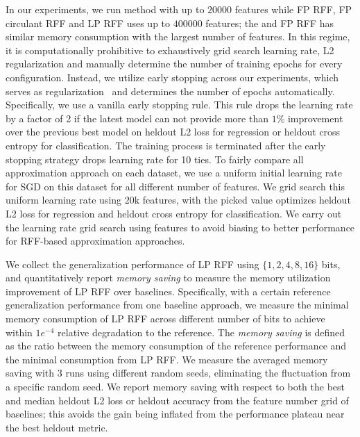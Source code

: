 In our experiments, we run \Nystrom method with up to $20000$ features while FP RFF, FP circulant RFF and LP RFF uses up to $400000$ features; the \Nystrom and FP RFF has similar memory consumption with the largest number of features. In this regime, it is computationally prohibitive to exhaustively grid search learning rate, L2 regularization and manually determine the number of training epochs for every configuration. Instead, we utilize early stopping across our experiments, which serves as regularization~\cite{wei2017early, zhang2005boosting} and determines the number of epochs automatically. Specifically, we use a vanilla early stopping rule. This rule drops the learning rate by a factor of 2 if the latest model can not provide more than $1\%$ improvement over the previous best model on heldout L2 loss for regression or heldout cross entropy for classification. The training process is terminated after the early stopping strategy drops learning rate for 10 ties. To fairly compare all approximation approach on each dataset, we use a uniform initial learning rate for SGD on this dataset for all different number of features. We grid search this uniform learning rate using $20\text{k}$ \Nystrom features, with the picked value optimizes heldout L2 loss for regression and heldout cross entropy for classification. We carry out the learning rate grid search using \Nystrom features to avoid biasing to better performance for RFF-based approximation approaches. 

We collect the generalization performance of LP RFF using $\{1,2,4,8,16\}$ bits, and quantitatively report \emph{memory saving} to measure the memory utilization improvement of LP RFF over baselines. Specifically, with a certain reference generalization performance from one baseline approach, we measure the minimal memory consumption of LP RFF across different number of bits to achieve within $1e^{-4}$ relative degradation to the reference. The \emph{memory saving} is defined as the ratio between the memory consumption of the reference performance and the minimal consumption from LP RFF. We measure the averaged memory saving with 3 runs using different random seeds, eliminating the fluctuation from a specific random seed. We report memory saving with respect to both the best and median heldout L2 loss or heldout accuracy from the feature number grid of baselines; this avoids the gain being inflated from the performance plateau near the best heldout metric.



